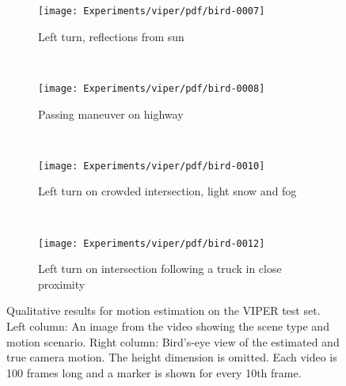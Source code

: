 		
		
		
		
		
		
		
		\begin{figure}[h]
			\centering
			\begin{subfigure}[t]{\linewidth}
				\centering
				\texttt{[image: Experiments/viper/pdf/bird-0007]}
				\caption{
					Left turn, reflections from sun
					\label{fig:viper-qualitative-sun-reflections}
				}
			\end{subfigure}%
			\\
			\begin{subfigure}[b]{\linewidth}
				\centering
				\texttt{[image: Experiments/viper/pdf/bird-0008]}
				\caption{
					Passing maneuver on highway
					\label{fig:viper-qualitative-passing-maneuver}
				}
			\end{subfigure}%
			\\
			\begin{subfigure}[b]{\linewidth}
				\centering
				\texttt{[image: Experiments/viper/pdf/bird-0010]}
				\caption{
					Left turn on crowded intersection, light snow and fog
					\label{fig:viper-qualitative-snow-crowded-intersection}
				}
			\end{subfigure}%
			\\
			\begin{subfigure}[b]{\linewidth}
				\centering
								\texttt{[image: Experiments/viper/pdf/bird-0012]}
				\caption{
					Left turn on intersection following a truck in close proximity
					\label{fig:viper-qualitative-truck-left-turn-close}
				}
			\end{subfigure}%
			\caption[Qualitative results for motion estimation on VIPER]
					{Qualitative results for motion estimation on the VIPER test set.
					 Left column: An image from the video showing the scene type and motion scenario.
					 Right column: Bird's-eye view of the estimated and true camera motion.
					 The height dimension is omitted.
					 Each video is 100 frames long and a marker is shown for every 10th frame.
					 \label{fig:viper-qualitative-results-images-and-estimation}}
		\end{figure}







